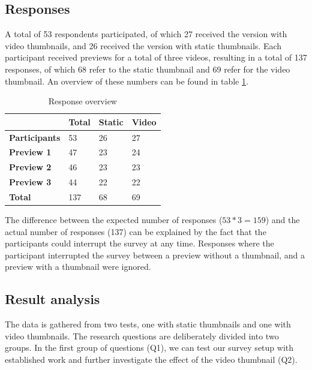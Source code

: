 \documentclass{../resources/sig-alternate-05-2015}
\begin{document}
\subsection{Responses}

A total of 53 respondents participated, of which 27 received the version with video thumbnails, and 26 received the version with static thumbnails. Each participant received previews for a total of three videos, resulting in a total of 137 responses, of which 68 refer to the static thumbnail and 69 refer for the video thumbnail. An overview of these numbers can be found in table \ref{table: number of responses table}.

\begin{table}[h]
\centering
\begin{tabular}{@{}llll@{}}
\textbf{}             & \textbf{Total} & \textbf{Static} & \textbf{Video} \\ \toprule
\textbf{Participants} & 53             & 26              & 27             \\ \midrule
\textbf{Preview 1}    & 47             & 23              & 24             \\
\textbf{Preview 2}    & 46             & 23              & 23             \\
\textbf{Preview 3}    & 44             & 22              & 22             \\ \bottomrule
\textbf{Total}        & 137            & 68              & 69             \\
\end{tabular}
\caption{Response overview}
\label{table: number of responses table}
\end{table}

The difference between the expected number of responses ($53 * 3 = 159$) and the actual number of responses (137) can be explained by the fact that the participants could interrupt the survey at any time. Responses where the participant interrupted the survey between a preview without a thumbnail, and a preview with a thumbnail were ignored.

\subsection{Result analysis}

The data is gathered from two tests, one with static thumbnails and one with video thumbnails. The research questions are deliberately divided into two groups. In the first group of questions (Q1), we can test our survey setup with established work and further investigate the effect of the video thumbnail (Q2).
\end{document}
